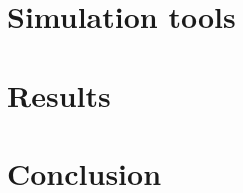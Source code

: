 \documentclass[english,twoside,openright]{UH_TCM_MSc}
\begin{document}
\chapter{Simulation tools}
\label{ch:simulation}


\chapter{Results}
\label{ch:results}


\chapter{Conclusion}
\label{ch:conclusion}


\cleardoublepage %

% 

\printbibliography


\end{document}
